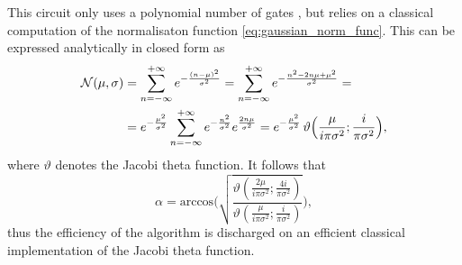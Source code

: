 \documentclass[a4paper,10pt]{report}
\begin{document}
This circuit only uses a polynomial number of gates \cite{kitaev08}, but relies on a classical computation of the normalisaton function \eqref{eq:gaussian_norm_func}. This can be expressed analytically in closed form as
\begin{align}
\mathcal{N}(\mu,\sigma) &= \sum_{n=-\infty}^{+\infty}e^{-\frac{(n-\mu)^2}{\sigma^2}} = \sum_{n=-\infty}^{+\infty}e^{-\frac{n^2-2n\mu+\mu^2}{\sigma^2}} = \nonumber\\ 
&=e^{-\frac{\mu^2}{\sigma^2}}\sum_{n=-\infty}^{+\infty}e^{-\frac{n^2}{\sigma^2}}e^{\frac{2n\mu}{\sigma^2}} = e^{-\frac{\mu^2}{\sigma^2}}\,\vartheta\Big(\frac{\mu}{i\pi\sigma^2};\frac{i}{\pi\sigma^2}\Big),
\end{align}
where $\vartheta$ denotes the Jacobi theta function. It follows that
\begin{equation}
\alpha = \mathrm{arccos}\Bigg(\sqrt{\frac{\vartheta(\frac{2\mu}{i\pi\sigma^2};\frac{4i}{\pi\sigma^2})}{\vartheta(\frac{\mu}{i\pi\sigma^2};\frac{i}{\pi\sigma^2})}}\Bigg),
\end{equation}
thus the efficiency of the algorithm is discharged on an efficient classical implementation of the Jacobi theta function.
\end{document}
